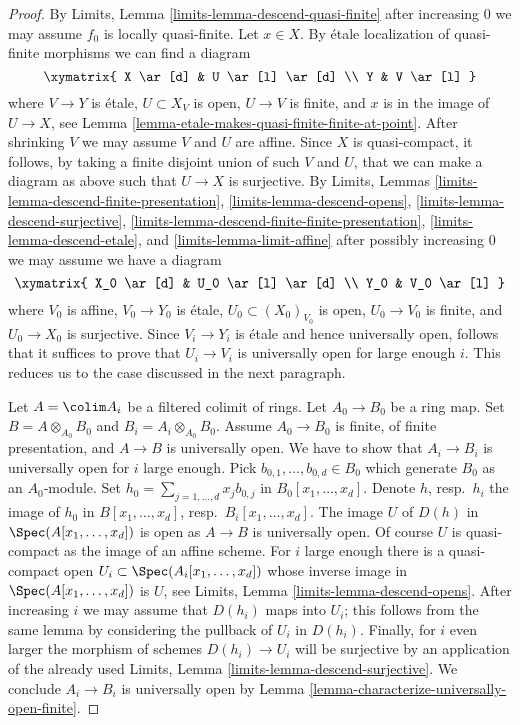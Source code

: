 \begin{proof}
By Limits, Lemma \ref{limits-lemma-descend-quasi-finite} after increasing
$0$ we may assume $f_0$ is locally quasi-finite. Let $x \in X$.
By \'etale localization of quasi-finite
morphisms we can find a diagram
$$
\xymatrix{
X \ar[d] & U \ar[l] \ar[d] \\
Y & V \ar[l]
}
$$
where $V \to Y$ is \'etale, $U \subset X_V$ is open, $U \to V$ is finite,
and $x$ is in the image of $U \to X$, see
Lemma \ref{lemma-etale-makes-quasi-finite-finite-at-point}.
After shrinking $V$ we may assume $V$ and $U$ are affine.
Since $X$ is quasi-compact, it follows, by taking a finite disjoint
union of such $V$ and $U$, that we can make a diagram as above
such that $U \to X$ is surjective. By
Limits, Lemmas \ref{limits-lemma-descend-finite-presentation},
\ref{limits-lemma-descend-opens},
\ref{limits-lemma-descend-surjective},
\ref{limits-lemma-descend-finite-finite-presentation},
\ref{limits-lemma-descend-etale}, and
\ref{limits-lemma-limit-affine} after possibly increasing $0$
we may assume we have a diagram
$$
\xymatrix{
X_0 \ar[d] & U_0 \ar[l] \ar[d] \\
Y_0 & V_0 \ar[l]
}
$$
where $V_0$ is affine, $V_0 \to Y_0$ is \'etale,
$U_0 \subset (X_0)_{V_0}$ is open, $U_0 \to V_0$ is finite,
and $U_0 \to X_0$ is surjective. Since $V_i \to Y_i$ is \'etale
and hence universally open, follows that it suffices
to prove that $U_i \to V_i$ is universally open for large
enough $i$. This reduces us to the case discussed in the next
paragraph.

\medskip\noindent
Let $A = \colim A_i$ be a filtered colimit of rings.
Let $A_0 \to B_0$ be a ring map. Set $B = A \otimes_{A_0} B_0$ and
$B_i = A_i \otimes_{A_0} B_0$. Assume $A_0 \to B_0$ is finite,
of finite presentation, and $A \to B$ is universally open.
We have to show that $A_i \to B_i$ is universally open for $i$ large enough.
Pick $b_{0, 1}, \ldots, b_{0, d} \in B_0$ which generate $B_0$
as an $A_0$-module. Set $h_0 = \sum_{j = 1, \ldots, d} x_jb_{0, j}$
in $B_0[x_1, \ldots, x_d]$. Denote $h$, resp.\ $h_i$ the image of $h_0$
in $B[x_1, \ldots, x_d]$, resp.\ $B_i[x_1, \ldots, x_d]$.
The image $U$ of $D(h)$ in $\Spec(A[x_1, \ldots, x_d])$ is open
as $A \to B$ is universally open. Of course $U$ is quasi-compact
as the image of an affine scheme. For $i$ large enough there
is a quasi-compact open $U_i \subset \Spec(A_i[x_1, \ldots, x_d])$
whose inverse image in $\Spec(A[x_1, \ldots, x_d])$ is $U$, see
Limits, Lemma \ref{limits-lemma-descend-opens}.
After increasing $i$ we may assume that $D(h_i)$ maps
into $U_i$; this follows from the same lemma by considering the
pullback of $U_i$ in $D(h_i)$. Finally, for $i$ even larger
the morphism of schemes $D(h_i) \to U_i$ will be surjective
by an application of the already used
Limits, Lemma \ref{limits-lemma-descend-surjective}.
We conclude $A_i \to B_i$ is universally open by
Lemma \ref{lemma-characterize-universally-open-finite}.
\end{proof}

